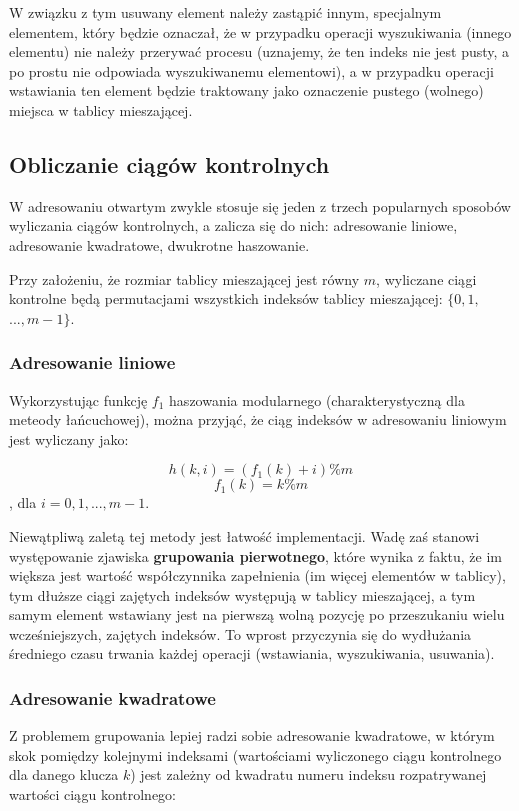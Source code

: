 \documentclass[twoside]{article}
\begin{document}
W związku z tym usuwany element należy zastąpić innym, specjalnym elementem, który będzie oznaczał,
że w przypadku operacji wyszukiwania (innego elementu) nie należy przerywać procesu
(uznajemy, że ten indeks nie jest pusty, a po prostu nie odpowiada wyszukiwanemu elementowi),
a w przypadku operacji wstawiania ten element będzie traktowany jako oznaczenie pustego (wolnego)
miejsca w tablicy mieszającej.

\subsection{Obliczanie ciągów kontrolnych}
W adresowaniu otwartym zwykle stosuje się jeden z trzech popularnych sposobów wyliczania ciągów
kontrolnych, a zalicza się do nich: adresowanie liniowe, adresowanie kwadratowe, dwukrotne haszowanie.

Przy założeniu, że rozmiar tablicy mieszającej jest równy $m$, wyliczane ciągi kontrolne będą
permutacjami wszystkich indeksów tablicy mieszającej: $\{0, 1,$ $ ..., m-1\}$.

\subsubsection{Adresowanie liniowe}
Wykorzystując funkcję $f_1$ haszowania modularnego (charakterystyczną dla meteody łańcuchowej),
można przyjąć, że ciąg indeksów w adresowaniu liniowym jest wyliczany jako:

$$h(k, i) = (f_1(k) + i) \% m$$
$$f_1(k) = k \% m$$
, dla $i = 0, 1, ..., m-1$.

Niewątpliwą zaletą tej metody jest łatwość implementacji.
Wadę zaś stanowi występowanie zjawiska \textbf{grupowania pierwotnego}, 
które wynika z faktu, że im większa jest wartość współczynnika zapełnienia (im więcej elementów 
w tablicy), tym dłuższe ciągi zajętych indeksów występują w tablicy mieszającej, a tym samym 
element wstawiany jest na pierwszą wolną pozycję po przeszukaniu wielu wcześniejszych, 
zajętych indeksów.
To wprost przyczynia się do wydłużania średniego czasu trwania każdej operacji (wstawiania, 
wyszukiwania, usuwania).

\subsubsection{Adresowanie kwadratowe}
Z problemem grupowania lepiej radzi sobie adresowanie kwadratowe, w którym skok pomiędzy kolejnymi
indeksami (wartościami wyliczonego ciągu kontrolnego dla danego klucza $k$) jest zależny od
kwadratu numeru indeksu rozpatrywanej wartości ciągu kontrolnego:
\end{document}
